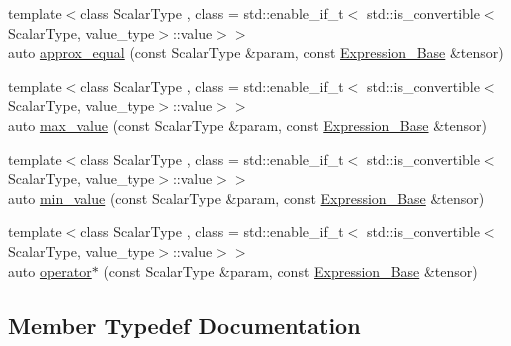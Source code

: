 \begin{DoxyCompactItemize}
\item 
{\footnotesize template$<$class Scalar\+Type , class  = std\+::enable\+\_\+if\+\_\+t$<$   std\+::is\+\_\+convertible$<$\+Scalar\+Type, value\+\_\+type$>$\+::value$>$$>$ }\\auto \hyperlink{classbc_1_1tensors_1_1Expression__Base_ac085082a371f111c69a4354961232029}{approx\+\_\+equal} (const Scalar\+Type \&param, const \hyperlink{classbc_1_1tensors_1_1Expression__Base}{Expression\+\_\+\+Base} \&tensor)
\item 
{\footnotesize template$<$class Scalar\+Type , class  = std\+::enable\+\_\+if\+\_\+t$<$   std\+::is\+\_\+convertible$<$\+Scalar\+Type, value\+\_\+type$>$\+::value$>$$>$ }\\auto \hyperlink{classbc_1_1tensors_1_1Expression__Base_a134cc79c65e313ff471ccbd1c4cff50f}{max\+\_\+value} (const Scalar\+Type \&param, const \hyperlink{classbc_1_1tensors_1_1Expression__Base}{Expression\+\_\+\+Base} \&tensor)
\item 
{\footnotesize template$<$class Scalar\+Type , class  = std\+::enable\+\_\+if\+\_\+t$<$   std\+::is\+\_\+convertible$<$\+Scalar\+Type, value\+\_\+type$>$\+::value$>$$>$ }\\auto \hyperlink{classbc_1_1tensors_1_1Expression__Base_ad0cc0e8e0904d59a9e73538bf0c680d2}{min\+\_\+value} (const Scalar\+Type \&param, const \hyperlink{classbc_1_1tensors_1_1Expression__Base}{Expression\+\_\+\+Base} \&tensor)
\item 
{\footnotesize template$<$class Scalar\+Type , class  = std\+::enable\+\_\+if\+\_\+t$<$   std\+::is\+\_\+convertible$<$\+Scalar\+Type, value\+\_\+type$>$\+::value$>$$>$ }\\auto \hyperlink{classbc_1_1tensors_1_1Expression__Base_ad924afa898e9dd9f51d1677a334b0152}{operator$\ast$} (const Scalar\+Type \&param, const \hyperlink{classbc_1_1tensors_1_1Expression__Base}{Expression\+\_\+\+Base} \&tensor)
\end{DoxyCompactItemize}


\subsection{Member Typedef Documentation}
\mbox{\label{classbc_1_1tensors_1_1Expression__Base_a7c54328db22f61f881e7607b5a69b8e5}} 
